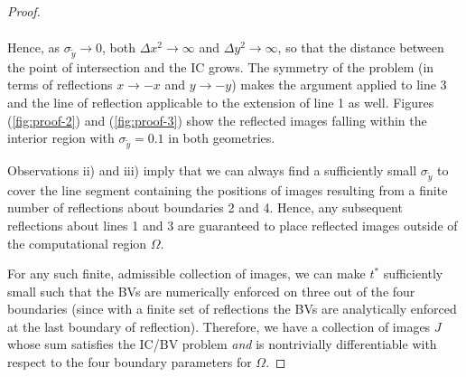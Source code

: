 \begin{proof}
\begin{enumerate}
\begin{align*}
    \end{align*}
    Hence, as $\sigma_{\tilde{y}} \to 0$, both $\Delta x^2 \to \infty$ and
    $\Delta y^2 \to \infty$, so that the distance between the point of
    intersection and the IC grows. The symmetry of the problem (in
    terms of reflections $x \to -x$ and $y \to -y$) makes the argument
    applied to line 3 and the line of reflection applicable to the
    extension of line 1 as well. Figures (\ref{fig:proof-2}) and
    (\ref{fig:proof-3}) show the reflected images falling within the
    interior region with $\sigma_{\tilde{y}} = 0.1$ in both geometries.
  \end{enumerate}
  Observations ii) and iii) imply that we can always find a
  sufficiently small $\sigma_{\tilde{y}}$ to cover the line segment
  containing the positions of images resulting from a finite number of
  reflections about boundaries 2 and 4.  Hence, any subsequent
  reflections about lines 1 and 3 are guaranteed to place reflected
  images outside of the computational region $\Omega$.

  For any such finite, admissible collection of images, we can make
  $t^*$ sufficiently small such that the BVs are numerically
  enforced on three out of the four boundaries (since with a finite
  set of reflections the BVs are analytically enforced at the last
  boundary of reflection). Therefore, we have a collection of images
  $J$ whose sum satisfies the IC/BV problem \textit{and} is
  nontrivially differentiable with respect to the four boundary
  parameters for $\Omega$.
\end{proof}



